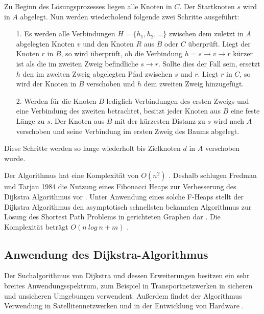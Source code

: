 Zu Beginn des Lösungsprozesses liegen alle Knoten in $C$. Der Startknoten $s$ wird in $A$ abgelegt. Nun werden wiederholend folgende zwei Schritte ausgeführt:
\begin{itemize}
	\item[1.] Es werden alle Verbindungen $H = \{h_1, h_2, ...\}$ zwischen dem zuletzt in $A$ abgelegten Knoten $v$ und den Knoten $R$ aus $B$ oder $C$ überprüft. Liegt der Knoten $r$ in $B$, so wird überprüft, ob die Verbindung $h = s \rightarrow v \rightarrow r$ kürzer ist als die im zweiten Zweig befindliche $s \rightarrow r$. Sollte dies der Fall sein, ersetzt $h$ den im zweiten Zweig abgelegten Pfad zwischen $s$ und $r$. Liegt $r$ in $C$, so wird der Knoten in $B$ verschoben und $h$ dem zweiten Zweig hinzugefügt.
	\item[2.] Werden für die Knoten $B$ lediglich Verbindungen des ersten Zweigs und eine Verbindung des zweiten betrachtet, besitzt jeder Knoten aus $B$ eine feste Länge zu $s$. Der Knoten aus $B$ mit der kürzesten Distanz zu $s$ wird nach $A$ verschoben und seine Verbindung im ersten Zweig des Baums abgelegt.
\end{itemize}
Diese Schritte werden so lange wiederholt bis Zielknoten $d$ in $A$ verschoben wurde.

Der Algorithmus hat eine Komplexität von $O(n^2)$ \cite{Madkour.2017}. Deshalb schlugen Fredman und Tarjan 1984 die Nutzung eines Fibonacci Heaps zur Verbesserung des Dijkstra Algorithmus vor \cite{Fredman.1987}. Unter Anwendung eines solche F-Heaps stellt der Dijkstra Algorithmus den asymptotisch schnellsten bekannten Algorithmus zur Lösung des Shortest Path Problems in gerichteten Graphen dar \cite{Schmitz.2019}.  Die Komplexität beträgt $O(n\ log\ n + m)$ \cite{Madkour.2017}. %



\subsection{Anwendung des Dijkstra-Algorithmus }

Der Suchalgorithmus von Dijkstra und dessen Erweiterungen besitzen ein sehr breites Anwendungsspektrum, zum Beispiel in Transportnetzwerken in sicheren und unsicheren Umgebungen \cite{fuzzyDijk} \cite{publicTrans} %
verwendent. Außerdem findet der Algorithmus Verwendung in Satellitennetzwerken \cite{satelite} und in der Entwicklung von Hardware \cite{hardware}.  %

